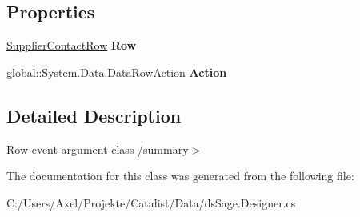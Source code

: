 \subsection*{Properties}
\begin{DoxyCompactItemize}
\item 
\hyperlink{class_products_1_1_data_1_1ds_sage_1_1_supplier_contact_row}{Supplier\+Contact\+Row} {\bfseries Row}\hypertarget{class_products_1_1_data_1_1ds_sage_1_1_supplier_contact_row_change_event_af9da73be2fb7ee030b8e55d9c72b90f4}{}\label{class_products_1_1_data_1_1ds_sage_1_1_supplier_contact_row_change_event_af9da73be2fb7ee030b8e55d9c72b90f4}

\item 
global\+::\+System.\+Data.\+Data\+Row\+Action {\bfseries Action}\hypertarget{class_products_1_1_data_1_1ds_sage_1_1_supplier_contact_row_change_event_a610c59ee1c4ed99cbb76c457f46e4947}{}\label{class_products_1_1_data_1_1ds_sage_1_1_supplier_contact_row_change_event_a610c59ee1c4ed99cbb76c457f46e4947}

\end{DoxyCompactItemize}


\subsection{Detailed Description}
Row event argument class /summary$>$ 

The documentation for this class was generated from the following file\+:\begin{DoxyCompactItemize}
\item 
C\+:/\+Users/\+Axel/\+Projekte/\+Catalist/\+Data/ds\+Sage.\+Designer.\+cs\end{DoxyCompactItemize}
